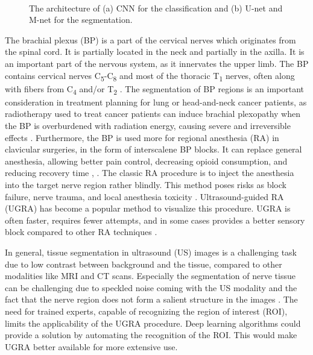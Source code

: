 \begin{figure*}[!tb] 
    \centering
     \\
    \caption{The architecture of (a) CNN for the classification and (b) U-net and M-net for the segmentation.}
    \label{fig:Hybrid_Model} 
\end{figure*}

The brachial plexus (BP) is a part of the cervical nerves which originates from the spinal cord. It is partially located in the neck and partially in the axilla. It is an important part of the nervous system, as it innervates the upper limb. The BP contains cervical nerves C\textsubscript{5}-C\textsubscript{8} and most of the thoracic T\textsubscript{1} nerves, often along with fibers from C\textsubscript{4} and/or T\textsubscript{2} \cite{Marieb}.
The segmentation of BP regions is an important consideration in treatment planning for lung or head-and-neck cancer patients, as radiotherapy used to treat cancer patients can induce brachial plexopathy when the BP is overburdened with radiation energy, causing severe and irreversible effects \cite{Yang2013}.
Furthermore, the BP is used more for regional anesthesia (RA) in clavicular surgeries, in the form of interscalene BP blocks. It can replace general anesthesia, allowing better pain control, decreasing opioid consumption, and reducing recovery time \cite{Pincus2019}, \cite{Banerjee2019}. The classic RA procedure is to inject the anesthesia into the target nerve region rather blindly. This method poses risks as block failure, nerve trauma, and local anesthesia toxicity \cite{Kakade2018}. Ultrasound-guided RA (UGRA) has become a popular method to visualize this procedure. UGRA is often faster, requires fewer attempts, and in some cases provides a better sensory block compared to other RA techniques \cite{Liu2009}.  

In general, tissue segmentation in ultrasound (US) images is a challenging task due to low contrast between background and the tissue, compared to other modalities like MRI and CT scans.
Especially the segmentation of nerve tissue can be challenging due to speckled noise coming with the US modality and the fact that the nerve region does not form a salient structure in the images \cite{Abraham2019}. The need for trained experts, capable of recognizing the region of interest (ROI), limits the applicability of the UGRA procedure. Deep learning algorithms could provide a solution by automating the recognition of the ROI. This would make UGRA better available for more extensive use.




